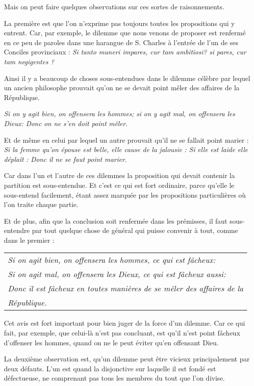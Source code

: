 Mais on peut faire quelques observations sur ces sortes de raisonnements.

La première est que l'on n'exprime pas toujours toutes les propositions qui y entrent. Car, par exemple, le dilemme que nous venons de proposer est renfermé en ce peu de paroles dans une harangue de S. Charles à l'entrée de l'un de ses Conciles provinciaux : \emph{Si tanto muneri impares, cur tam ambitiosi? si pares, cur tam negigentes ?}

Ainsi il y a beaucoup de choses sous-entendues dans le dilemme célèbre par lequel un ancien philosophe prouvait qu'on ne se devait point mêler des affaires de la République.

\emph{Si on y agit bien, on offensera les hommes; si on y agit mal, on offensera les Dieux: Donc on ne s'en doit point mêler}.

Et de même en celui par lequel un autre prouvait qu'il ne se fallait point marier : \emph{Si la femme qu'on épouse est belle, elle cause de la jalousie : Si elle est laide elle déplaît : Donc il ne se faut point marier}.

Car dans l'un et l'autre de ces dilemmes la proposition qui devait contenir la partition est sous-entendue. Et c'est ce qui est fort ordinaire, parce qu'elle le sous-entend facilement, étant assez marquée par les propositions particulières où l'on traite chaque partie.

Et de plus, afin que la conclusion soit renfermée dans les prémisses, il faut sous-entendre par tout quelque chose de général qui puisse convenir à tout, comme dans le premier :

	\begin{tabularx}{\textwidth}{X}
		\emph{Si on agit bien, on offensera les hommes, ce qui est fâcheux:} \\
		\emph{Si on agit mal, on offensera les Dieux, ce qui est fâcheux aussi:} \\
		\emph{Donc il est fâcheux en toutes manières de se mêler des affaires de la} \\
		\emph{\space\space\space\space\space République.} \\
\end{tabularx}

Cet avis est fort important pour bien juger de la force d'un dilemme. Car ce qui fait, par exemple, que celui-là n'est pas concluant, est qu'il n'est point fâcheux d'offenser les hommes, quand on ne le peut éviter qu'en offensant Dieu.

La deuxième observation est, qu'un dilemme peut être vicieux principalement par deux défauts. L'un est quand la disjonctive sur laquelle il est fondé est défectueuse, ne comprenant pas tous les membres du tout que l'on divise.

